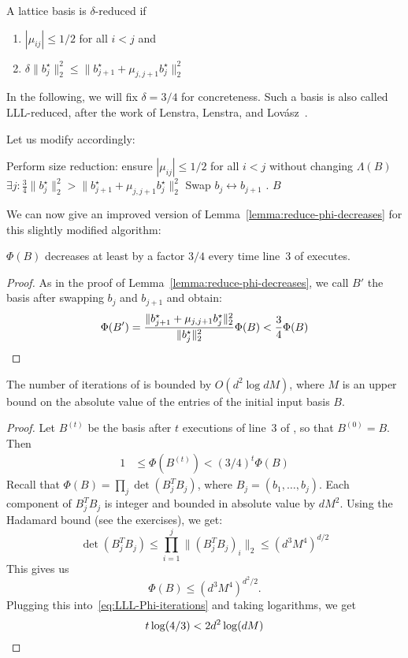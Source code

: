 \begin{definition}
  A lattice basis is $\delta$-reduced if
  \begin{enumerate}
    \item $|\mu_{ij}| \leq 1/2$ for all $i < j$ and
    \item $\delta \|b_j^\star\|_2^2 \leq \|b_{j+1}^\star + \mu_{j,j+1} b_j^\star\|_2^2$
  \end{enumerate}
\end{definition}
In the following, we will fix $\delta = 3/4$ for concreteness.
Such a basis is also called LLL-reduced,
after the work of Lenstra, Lenstra, and Lovász~\cite{MR682664}.

Let us modify  accordingly:
\begin{codebox}
  \li Perform size reduction: ensure $|\mu_{ij}| \leq 1/2$ for all $i < j$ without changing $\Lambda(B)$
  \li \If $\exists j: \frac{3}{4} \|b_j^\star\|_2^2 > \|b_{j+1}^\star + \mu_{j,j+1} b_j^\star\|_2^2$
  \li \Then Swap $b_j \leftrightarrow b_{j+1}$
  \li       {}.
      \End
  \li \Return $B$
\end{codebox}

We can now give an improved version of Lemma~\ref{lemma:reduce-phi-decreases} for this slightly modified algorithm:

\begin{lemma}
  \label{lemma:lll-reduce-phi-decreases}
  $\Phi(B)$ decreases at least by a factor $3/4$ every time line~3 of  executes.
\end{lemma}
\begin{proof}
  As in the proof of Lemma~\ref{lemma:reduce-phi-decreases},
  we call $B'$ the basis after swapping $b_j$ and $b_{j+1}$ and obtain:
  \[
    \Phi(B') = \frac{\|b_{j+1}^\star + \mu_{j,j+1} b_j^\star\|_2^2}{\|b_j^\star\|_2^2} \Phi(B) < \frac{3}{4} \Phi(B) \qedhere
  \]
\end{proof}

\begin{lemma}
  \label{lemma:lll-iterations}
  The number of iterations of  is bounded by $O(d^2 \log dM)$,
  where $M$ is an upper bound on the absolute value of the entries of the initial input basis $B$.
\end{lemma}
\begin{proof}
  Let $B^{(t)}$ be the basis after $t$ executions of line~3 of , so that $B^{(0)} = B$.
  Then
  \begin{align}
    \label{eq:LLL-Phi-iterations}
    1 &\leq \Phi(B^{(t)}) < (3/4)^t \Phi(B)
  \end{align}
  Recall that $\Phi(B) = \prod_j \det(B_j^T B_j)$,
  where $B_j = (b_1, \ldots, b_j)$.
  Each component of $B_j^T B_j$ is integer and bounded in absolute value by $dM^2$.
  Using the Hadamard bound (see the exercises), we get:
  \[
    \det(B_j^T B_j) \leq \prod_{i=1}^j \| (B_j^T B_j)_i \|_2 \leq (d^3M^4)^{d/2}
  \]
  This gives us
  \[
    \Phi(B) \leq (d^3 M^4)^{d^2/2}.
  \]
  Plugging this into~\eqref{eq:LLL-Phi-iterations} and taking logarithms, we get
  \[
    t \log(4/3) < 2d^2 \log(dM) \qedhere
  \]
\end{proof}

